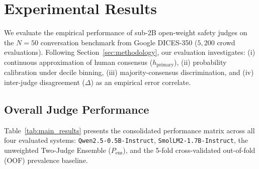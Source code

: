 \section{Experimental Results}
\label{sec:results}

We evaluate the empirical performance of sub-2B open-weight safety judges on the $N=50$ conversation benchmark from Google DICES-350 ($5,200$ crowd evaluations). Following Section~\ref{sec:methodology}, our evaluation investigates: (i) continuous approximation of human consensus ($h_{\text{primary}}$), (ii) probability calibration under decile binning, (iii) majority-consensus discrimination, and (iv) inter-judge disagreement ($\Delta$) as an empirical error correlate.

\subsection{Overall Judge Performance}
\label{subsec:overall_performance}

Table~\ref{tab:main_results} presents the consolidated performance matrix across all four evaluated systems: \texttt{Qwen2.5-0.5B-Instruct}, \texttt{SmolLM2-1.7B-Instruct}, the unweighted Two-Judge Ensemble ($P_{\text{ens}}$), and the 5-fold cross-validated out-of-fold (OOF) prevalence baseline.

